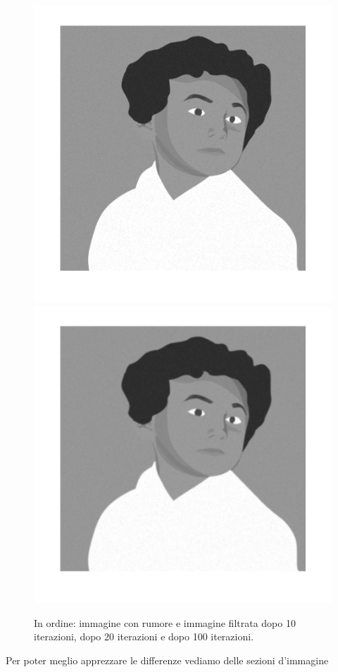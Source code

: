 \begin{figure}[htb]
\includegraphics[scale=0.25]{Pictures/Esempi di utilizzo/Esempio 2/raffo_filtrata_n_iter20.png}
\includegraphics[scale=0.25]{Pictures/Esempi di utilizzo/Esempio 2/raffo_filtrata_n_iter100.png}
\caption{In ordine: immagine con rumore e immagine filtrata dopo 10 iterazioni, dopo 20 iterazioni e dopo 100 iterazioni.}\label{fig:figura}
\end{figure} 
Per poter meglio apprezzare le differenze vediamo delle sezioni d'immagine\\

